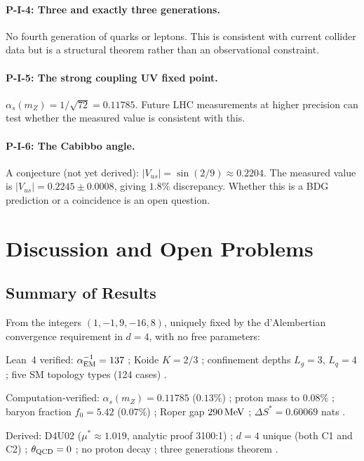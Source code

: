 \documentclass[12pt,a4paper]{article}
\begin{document}
\paragraph{P-I-4: Three and exactly three generations.}  No fourth generation of quarks or leptons.  This is consistent with current collider data but is a structural theorem rather than an observational constraint.

\paragraph{P-I-5: The strong coupling UV fixed point.}  $\alpha_s(m_Z)=1/\sqrt{72}=0.11785$.  Future LHC measurements at higher precision can test whether the measured value is consistent with this.

\paragraph{P-I-6: The Cabibbo angle.}  A conjecture (not yet derived): $|V_{us}|=\sin(2/9)\approx0.2204$.  The measured value is $|V_{us}|=0.2245\pm0.0008$, giving $1.8\%$ discrepancy.  Whether this is a BDG prediction or a coincidence is an open question.

\section{Discussion and Open Problems}\label{sec:discussion}

\subsection{Summary of Results}

From the integers $(1,-1,9,-16,8)$, uniquely fixed by the d'Alembertian convergence requirement in $d=4$, with no free parameters:

Lean~4 verified: $\alpha_{\rm EM}^{-1}=137$ \statusLV; Koide $K=2/3$ \statusLV; confinement depths $L_g=3$, $L_q=4$ \statusLV; five SM topology types (124 cases) \statusLV.

Computation-verified: $\alpha_s(m_Z)=0.11785$ ($0.13\%$) \statusCV; proton mass to $0.08\%$ \statusCV; baryon fraction $f_0=5.42$ ($0.07\%$) \statusCV; Roper gap $290\,{\rm MeV}$ \statusCV; $\Delta S^*=0.60069$ nats \statusCV.

Derived: D4U02 ($\mu^*\approx1.019$, analytic proof 3100:1) \statusDR; $d=4$ unique (both C1 and C2) \statusDR; $\theta_{\rm QCD}=0$ \statusDR; no proton decay \statusDR; three generations theorem \statusDR.
\end{document}
